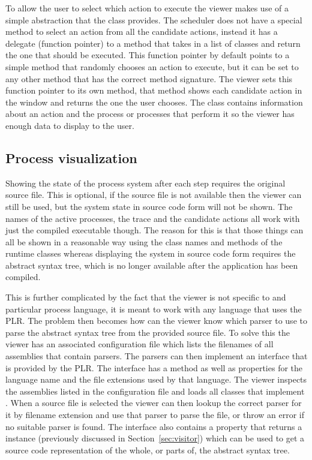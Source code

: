   To allow the user to select which action to execute the viewer makes use of
  a simple abstraction that the  class provides. The scheduler
  does not have a special method to select an action from all the candidate 
  actions, instead it has a delegate (function pointer) to a method that takes
  in a list of  classes and return the one that should be
  executed. This function pointer by default points to a simple method that 
  randomly chooses an action to execute, but it can be set to any other method
  that has the correct method signature. The viewer sets this function pointer
  to its own method, that method shows each candidate action in the window and
  returns the one the user chooses. The  class contains
  information about an action and the process or processes that perform it so
  the viewer has enough data to display to the user.

  \subsection{Process visualization}\label{sec:process_visualization}
	
	Showing the state of the process system after each step requires the original
	source file. This is optional, if the source file is not available then the
	viewer can still be used, but the system state in source code form will not
	be shown. The names of the active processes, the trace and the candidate 
	actions all work with just the compiled executable though. The reason for 
	this is that those things can all be shown in a reasonable way using the 
	class names and  methods of the runtime classes whereas 
	displaying the system in source code form  requires the abstract syntax 
	tree, which is no longer available after the application has been compiled. 
	
	This is further complicated by the fact that the viewer is not specific to 
	and particular process language, it is meant to work with any language that 
	uses the PLR. The problem then becomes how can the viewer know which parser 
	to use to parse the abstract syntax tree from the provided source file. To 
	solve this the viewer has an associated configuration file which lists the 
	filenames of all assemblies that contain parsers. The parsers can then 
	implement an  interface that is provided by the PLR. The 
	interface has a  method as well as properties for the language 
	name and the file extensions used by that language. The viewer inspects the 
	assemblies listed in the configuration file and loads all classes that 
	implement . When a source file is selected the viewer can then 
	lookup the correct parser for it by filename extension and use that parser 
	to parse the file, or throw an error if no suitable parser is found. The 
	 interface also contains a property that returns a 
	 instance (previously discussed in 
	Section~\ref{sec:visitor}) which can be used to get a source code
	representation of the whole, or parts of, the abstract syntax tree.
	
